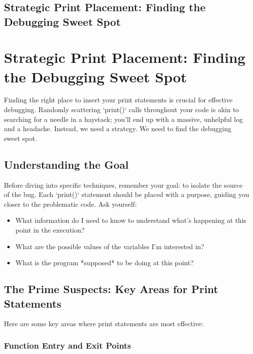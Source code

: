 \documentclass{article}
\begin{document}
\newpage

\section*{Strategic Print Placement: Finding the Debugging Sweet Spot} %
\label{chapter-1-2-Strategic_Print_Placement__Finding_the_D}

\chapter{Strategic Print Placement: Finding the Debugging Sweet Spot}

Finding the right place to insert your print statements is crucial for effective debugging. Randomly scattering `print()` calls throughout your code is akin to searching for a needle in a haystack; you'll end up with a massive, unhelpful log and a headache. Instead, we need a strategy. We need to find the debugging sweet spot.

\section*{Understanding the Goal}

Before diving into specific techniques, remember your goal: to isolate the source of the bug. Each `print()` statement should be placed with a purpose, guiding you closer to the problematic code. Ask yourself:

\begin{itemize}
    \item What information do I need to know to understand what's happening at this point in the execution?
    \item What are the possible values of the variables I'm interested in?
    \item What is the program *supposed* to be doing at this point?
\end{itemize}

\section*{The Prime Suspects: Key Areas for Print Statements}

Here are some key areas where print statements are most effective:

\subsection*{Function Entry and Exit Points}
\end{document}

